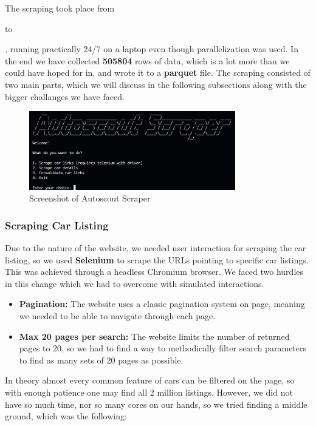 \documentclass[12pt]{article}
\begin{document}
The scraping took place from \date{2025-04-03} to \date{2025-04-08}, running practically 24/7 on a laptop even though parallelization was used. In the end we have collected \textbf{505804} rows of data, which is a lot more than we could have hoped for in, and wrote it to a \textbf{parquet} file. The scraping consisted of two main parts, which we will discuss in the following subsections along with the bigger challanges we have faced.

\begin{figure}[ht]
  \centering
  \includegraphics[width=0.8\textwidth]{./images/autoscout_scraper.png}
  \caption{Screenshot of Autoscout Scraper}
  \label{fig:autoscout_scraper}
\end{figure}

\subsubsection{Scraping Car Listing}

Due to the nature of the website, we needed user interaction for scraping the car listing, so we used \textbf{Selenium} to scrape the URLs pointing to specific car listings. This was achieved through a headless Chromium browser.
We faced two hurdles in this change which we had to overcome with simulated interactions.

\begin{itemize}
  \item \textbf{Pagination:} The website uses a classic pagination system on page, meaning we needed to be able to navigate through each page.
  \item \textbf{Max 20 pages per search:} The website limits the number of returned pages to 20, so we had to find a way to methodically filter search parameters to find as many sets of 20 pages as possible.
\end{itemize}

In theory almost every common feature of cars can be filtered on the page, so with enough patience one may find all 2 million listings. However, we did not have so much time, nor so many cores on our hands, so we tried finding a middle ground, which was the following:
\end{document}
